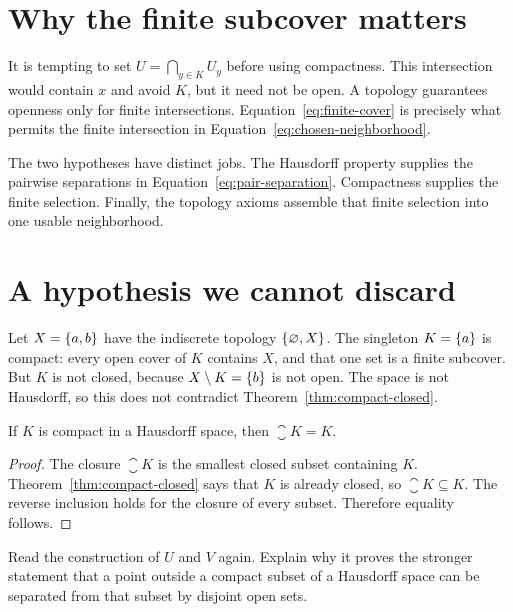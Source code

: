 \documentclass[11pt]{article}
\begin{document}
\section{Why the finite subcover matters}
It is tempting to set $U=\bigcap_{y\in K}U_y$ before using compactness.
This intersection would contain $x$ and avoid $K$, but it need not be
open. A topology guarantees openness only for finite intersections.
Equation~\ref{eq:finite-cover} is precisely what permits the finite
intersection in Equation~\ref{eq:chosen-neighborhood}.

The two hypotheses have distinct jobs. The Hausdorff property supplies
the pairwise separations in Equation~\ref{eq:pair-separation}.
Compactness supplies the finite selection. Finally, the topology axioms
assemble that finite selection into one usable neighborhood.

\section{A hypothesis we cannot discard}
\begin{example}
Let $X=\left\{a,b\right\}$ have the indiscrete topology
$\left\{\varnothing,X\right\}$. The singleton $K=\left\{a\right\}$ is compact: every open
cover of $K$ contains $X$, and that one set is a finite subcover. But
$K$ is not closed, because $X\setminus K=\left\{b\right\}$ is not open. The
space is not Hausdorff, so this does not contradict
Theorem~\ref{thm:compact-closed}.
\end{example}

\begin{corollary}
If $K$ is compact in a Hausdorff space, then $\closure{K}=K$.
\end{corollary}
\begin{proof}
The closure $\closure{K}$ is the smallest closed subset containing $K$.
Theorem~\ref{thm:compact-closed} says that $K$ is already closed, so
$\closure{K}\subseteq K$. The reverse inclusion holds for the closure
of every subset. Therefore equality follows.
\end{proof}

\begin{exercise}
Read the construction of $U$ and $V$ again. Explain why it proves the
stronger statement that a point outside a compact subset of a Hausdorff
space can be separated from that subset by disjoint open sets.
\end{exercise}
\end{document}
